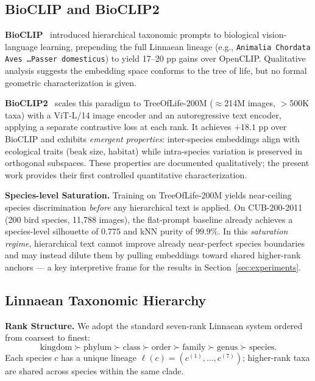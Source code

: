 \subsection{BioCLIP and BioCLIP2}

\noindent\textbf{BioCLIP}~\cite{stevens2024bioclip} introduced hierarchical taxonomic
prompts to biological vision-language learning, prepending the full Linnaean lineage
(e.g., \texttt{Animalia Chordata Aves \ldots Passer domesticus}) to yield 17--20 pp
gains over OpenCLIP. Qualitative analysis suggests the embedding space conforms to
the tree of life, but no formal geometric characterization is given.

\noindent\textbf{BioCLIP2}~\cite{gu2025bioclip2} scales this paradigm to
TreeOfLife-200M ($\approx$214M images, ${>}$500K taxa) with a ViT-L/14 image encoder
and an autoregressive text encoder, applying a separate contrastive loss at each rank.
It achieves $+18.1$ pp over BioCLIP and exhibits \emph{emergent properties}:
inter-species embeddings align with ecological traits (beak size, habitat) while
intra-species variation is preserved in orthogonal subspaces.
These properties are documented qualitatively; the present work provides their first
controlled quantitative characterization.

\noindent\textbf{Species-level Saturation.}
Training on TreeOfLife-200M yields near-ceiling species discrimination \emph{before}
any hierarchical text is applied.
On CUB-200-2011 (200 bird species, 11,788 images), the flat-prompt baseline already
achieves a species-level silhouette of $0.775$ and kNN purity of $99.9\%$.
In this \emph{saturation regime}, hierarchical text cannot improve already near-perfect
species boundaries and may instead dilute them by pulling embeddings toward shared
higher-rank anchors — a key interpretive frame for the results in Section~\ref{sec:experiments}.

\subsection{Linnaean Taxonomic Hierarchy}

\noindent\textbf{Rank Structure.}
We adopt the standard seven-rank Linnaean system ordered from coarsest to finest:
\begin{equation}
\text{kingdom} \succ \text{phylum} \succ \text{class} \succ \text{order}
\succ \text{family} \succ \text{genus} \succ \text{species}.
\label{eq:linnaean_ranks}
\end{equation}
Each species $c$ has a unique lineage $\ell(c) = (c^{(1)}, \dots, c^{(7)})$;
higher-rank taxa are shared across species within the same clade.


